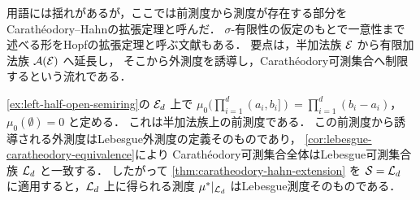 \begin{remark}[Hopfの拡張定理との関係]
用語には揺れがあるが，ここでは前測度から測度が存在する部分を
Carathéodory--Hahnの拡張定理と呼んだ．
$\sigma$-有限性の仮定のもとで一意性まで述べる形をHopfの拡張定理と呼ぶ文献もある．
要点は，半加法族 $\mathcal E$ から有限加法族 $\mathcal A(\mathcal E)$ へ延長し，
そこから外測度を誘導し，Carathéodory可測集合へ制限するという流れである．
\end{remark}

\begin{example}[Lebesgue測度]\label{ex:lebesgue-measure-from-caratheodory-hahn}
\cref{ex:left-half-open-semiring}の $\mathcal E_d$ 上で
$\mu_0(\prod_{i=1}^d(a_i,b_i])=\prod_{i=1}^d(b_i-a_i)$，
$\mu_0(\emptyset)=0$ と定める．
これは半加法族上の前測度である．
この前測度から誘導される外測度はLebesgue外測度の定義そのものであり，
\cref{cor:lebesgue-caratheodory-equivalence}により
Carathéodory可測集合全体はLebesgue可測集合族 $\mathcal L_d$ と一致する．
したがって \cref{thm:caratheodory-hahn-extension} を
$\mathcal S=\mathcal L_d$ に適用すると，$\mathcal L_d$ 上に得られる測度
$\mu^*|_{\mathcal L_d}$ はLebesgue測度そのものである．
\end{example}

%

